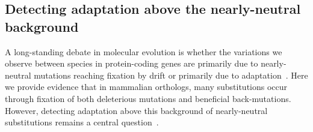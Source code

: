 \documentclass{article}
\begin{document}

    \subsection*{Detecting adaptation above the nearly-neutral background}

    A long-standing debate in molecular evolution is whether the variations we observe between species in protein-coding genes are primarily due to nearly-neutral mutations reaching fixation by drift or primarily due to adaptation~\cite{kimura_evolutionary_1968,kern_neutral_2018,jensen_importance_2019,gillespie_substitution_1994,Ohta1992}.
    Here we provide evidence that in mammalian orthologs, many substitutions occur through fixation of both deleterious mutations and beneficial back-mutations.
    However, detecting adaptation above this background of nearly-neutral substitutions remains a central question~\cite{kimura_evolutionary_1968,ohta_development_1996}.
\end{document}
